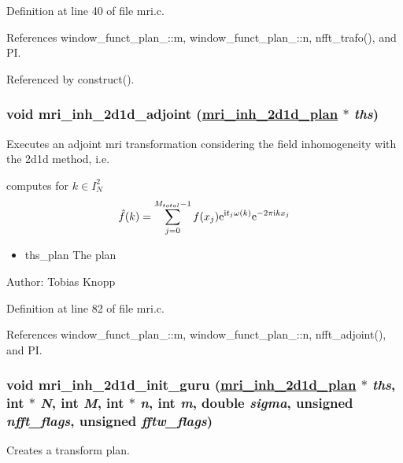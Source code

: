 Definition at line 40 of file mri.c.

References window\_\-funct\_\-plan\_\-::m, window\_\-funct\_\-plan\_\-::n, nfft\_\-trafo(), and PI.

Referenced by construct().\hypertarget{group__mri_ga1}{
\subsubsection[mri\_\-inh\_\-2d1d\_\-adjoint]{\setlength{\rightskip}{0pt plus 5cm}void mri\_\-inh\_\-2d1d\_\-adjoint (\hyperlink{structmri__inh__2d1d__plan}{mri\_\-inh\_\-2d1d\_\-plan} $\ast$ {\em ths})}}
\label{group__mri_ga1}


Executes an adjoint mri transformation considering the field inhomogeneity with the 2d1d method, i.e. 

computes for $k \in I_N^2$ \[ \hat{f}(k) = \sum_{j=0}^{M_{total}-1} f(x_j) {\rm e}^{\mbox{\rm\scriptsize i} t_j \omega(k)} {\rm e}^{-2 \pi \mbox{\rm\scriptsize i} k x_j} \]

\begin{itemize}
\item ths\_\-plan The plan\end{itemize}
\begin{Desc}
\item[Author:]Tobias Knopp \end{Desc}


Definition at line 82 of file mri.c.

References window\_\-funct\_\-plan\_\-::m, window\_\-funct\_\-plan\_\-::n, nfft\_\-adjoint(), and PI.\hypertarget{group__mri_ga2}{
\subsubsection[mri\_\-inh\_\-2d1d\_\-init\_\-guru]{\setlength{\rightskip}{0pt plus 5cm}void mri\_\-inh\_\-2d1d\_\-init\_\-guru (\hyperlink{structmri__inh__2d1d__plan}{mri\_\-inh\_\-2d1d\_\-plan} $\ast$ {\em ths}, int $\ast$ {\em N}, int {\em M}, int $\ast$ {\em n}, int {\em m}, double {\em sigma}, unsigned {\em nfft\_\-flags}, unsigned {\em fftw\_\-flags})}}
\label{group__mri_ga2}


Creates a transform plan. 

